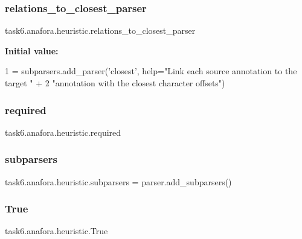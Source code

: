 \subsubsection{\texorpdfstring{relations\+\_\+to\+\_\+closest\+\_\+parser}{relations\_to\_closest\_parser}}
{\footnotesize\ttfamily task6.\+anafora.\+heuristic.\+relations\+\_\+to\+\_\+closest\+\_\+parser}

{\bfseries Initial value\+:}
\begin{DoxyCode}
1 =  subparsers.add\_parser(\textcolor{stringliteral}{'closest'}, help=\textcolor{stringliteral}{"Link each source annotation to the target "} +
2                                                                         \textcolor{stringliteral}{"annotation with the closest
       character offsets"})
\end{DoxyCode}
\mbox{\label{namespacetask6_1_1anafora_1_1heuristic_a819a73aa552153c122f935c2425dda6e}} 
\subsubsection{\texorpdfstring{required}{required}}
{\footnotesize\ttfamily task6.\+anafora.\+heuristic.\+required}

\mbox{\label{namespacetask6_1_1anafora_1_1heuristic_a0cfc2949aae6bff43d53d7424d710429}} 
\subsubsection{\texorpdfstring{subparsers}{subparsers}}
{\footnotesize\ttfamily task6.\+anafora.\+heuristic.\+subparsers = parser.\+add\+\_\+subparsers()}

\mbox{\label{namespacetask6_1_1anafora_1_1heuristic_abbb4ab68f434fd71ac56434f6c9e0605}} 
\subsubsection{\texorpdfstring{True}{True}}
{\footnotesize\ttfamily task6.\+anafora.\+heuristic.\+True}

